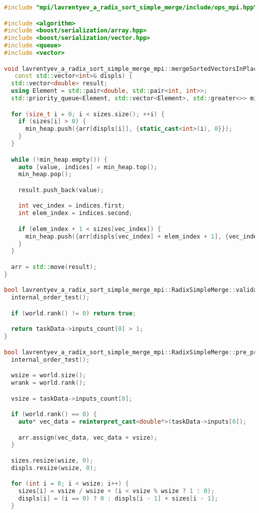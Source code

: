 \documentclass[12pt]{article}
\begin{document}
\begin{lstlisting}[language=C++]
#include "mpi/lavrentyev_a_radix_sort_simple_merge/include/ops_mpi.hpp"

#include <algorithm>
#include <boost/serialization/array.hpp>
#include <boost/serialization/vector.hpp>
#include <queue>
#include <vector>

void lavrentyev_a_radix_sort_simple_merge_mpi::mergeSortedVectorsInPlace(std::vector<double>& arr, const std::vector<int>& sizes,
   const std::vector<int>& displs) {
  std::vector<double> result;
  using Element = std::pair<double, std::pair<int, int>>;
  std::priority_queue<Element, std::vector<Element>, std::greater<>> min_heap;

  for (size_t i = 0; i < sizes.size(); ++i) {
    if (sizes[i] > 0) {
      min_heap.push({arr[displs[i]], {static_cast<int>(i), 0}});
    }
  }

  while (!min_heap.empty()) {
    auto [value, indices] = min_heap.top();
    min_heap.pop();

    result.push_back(value);

    int vec_index = indices.first;
    int elem_index = indices.second;

    if (elem_index + 1 < sizes[vec_index]) {
      min_heap.push({arr[displs[vec_index] + elem_index + 1], {vec_index, elem_index + 1}});
    }
  }

  arr = std::move(result);
}

bool lavrentyev_a_radix_sort_simple_merge_mpi::RadixSimpleMerge::validation() {
  internal_order_test();

  if (world.rank() != 0) return true;

  return taskData->inputs_count[0] > 1;
}

bool lavrentyev_a_radix_sort_simple_merge_mpi::RadixSimpleMerge::pre_processing() {
  internal_order_test();

  wsize = world.size();
  wrank = world.rank();

  vsize = taskData->inputs_count[0];

  if (world.rank() == 0) {
    auto* vec_data = reinterpret_cast<double*>(taskData->inputs[0]);

    arr.assign(vec_data, vec_data + vsize);
  }

  sizes.resize(wsize, 0);
  displs.resize(wsize, 0);

  for (int i = 0; i < wsize; i++) {
    sizes[i] = vsize / wsize + (i < vsize % wsize ? 1 : 0);
    displs[i] = (i == 0) ? 0 : displs[i - 1] + sizes[i - 1];
  }


\end{lstlisting}
\end{document}
